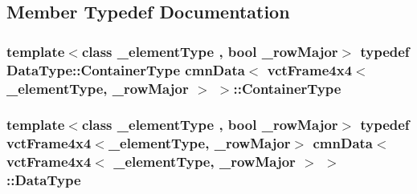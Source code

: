 \subsection{Member Typedef Documentation}
\hypertarget{classcmn_data_3_01vct_frame4x4_3_01__element_type_00_01__row_major_01_4_01_4_ae99fda61ec4aed99e356a16b3fdbf448}{
\subsubsection[{Container\-Type}]{\setlength{\rightskip}{0pt plus 5cm}template$<$class \-\_\-element\-Type , bool \-\_\-row\-Major$>$ typedef {\bf Data\-Type\-::\-Container\-Type} {\bf cmn\-Data}$<$ {\bf vct\-Frame4x4}$<$ \-\_\-element\-Type, \-\_\-row\-Major $>$ $>$\-::{\bf Container\-Type}}}\label{classcmn_data_3_01vct_frame4x4_3_01__element_type_00_01__row_major_01_4_01_4_ae99fda61ec4aed99e356a16b3fdbf448}
\hypertarget{classcmn_data_3_01vct_frame4x4_3_01__element_type_00_01__row_major_01_4_01_4_abf4e17a9d0af654027bedb454326d1d2}{
\subsubsection[{Data\-Type}]{\setlength{\rightskip}{0pt plus 5cm}template$<$class \-\_\-element\-Type , bool \-\_\-row\-Major$>$ typedef {\bf vct\-Frame4x4}$<$\-\_\-element\-Type, \-\_\-row\-Major$>$ {\bf cmn\-Data}$<$ {\bf vct\-Frame4x4}$<$ \-\_\-element\-Type, \-\_\-row\-Major $>$ $>$\-::{\bf Data\-Type}}}\label{classcmn_data_3_01vct_frame4x4_3_01__element_type_00_01__row_major_01_4_01_4_abf4e17a9d0af654027bedb454326d1d2}


